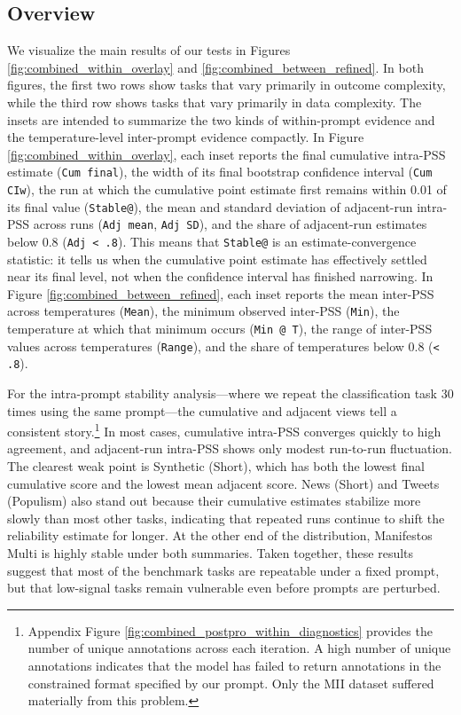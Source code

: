 \documentclass{article}
\begin{document}
\subsection{Overview}

We visualize the main results of our tests in Figures \ref{fig:combined_within_overlay} and \ref{fig:combined_between_refined}. In both figures, the first two rows show tasks that vary primarily in outcome complexity, while the third row shows tasks that vary primarily in data complexity. The insets are intended to summarize the two kinds of within-prompt evidence and the temperature-level inter-prompt evidence compactly. In Figure \ref{fig:combined_within_overlay}, each inset reports the final cumulative intra-PSS estimate (\texttt{Cum final}), the width of its final bootstrap confidence interval (\texttt{Cum CIw}), the run at which the cumulative point estimate first remains within 0.01 of its final value (\texttt{Stable@}), the mean and standard deviation of adjacent-run intra-PSS across runs (\texttt{Adj mean}, \texttt{Adj SD}), and the share of adjacent-run estimates below 0.8 (\texttt{Adj < .8}). This means that \texttt{Stable@} is an estimate-convergence statistic: it tells us when the cumulative point estimate has effectively settled near its final level, not when the confidence interval has finished narrowing. In Figure \ref{fig:combined_between_refined}, each inset reports the mean inter-PSS across temperatures (\texttt{Mean}), the minimum observed inter-PSS (\texttt{Min}), the temperature at which that minimum occurs (\texttt{Min @ T}), the range of inter-PSS values across temperatures (\texttt{Range}), and the share of temperatures below 0.8 (\texttt{< .8}).

For the intra-prompt stability analysis---where we repeat the classification task 30 times using the same prompt---the cumulative and adjacent views tell a consistent story.\footnote{Appendix Figure \ref{fig:combined_postpro_within_diagnostics} provides the number of unique annotations across each iteration. A high number of unique annotations indicates that the model has failed to return annotations in the constrained format specified by our prompt. Only the MII dataset suffered materially from this problem.} In most cases, cumulative intra-PSS converges quickly to high agreement, and adjacent-run intra-PSS shows only modest run-to-run fluctuation. The clearest weak point is Synthetic (Short), which has both the lowest final cumulative score and the lowest mean adjacent score. News (Short) and Tweets (Populism) also stand out because their cumulative estimates stabilize more slowly than most other tasks, indicating that repeated runs continue to shift the reliability estimate for longer. At the other end of the distribution, Manifestos Multi is highly stable under both summaries. Taken together, these results suggest that most of the benchmark tasks are repeatable under a fixed prompt, but that low-signal tasks remain vulnerable even before prompts are perturbed.
\end{document}
